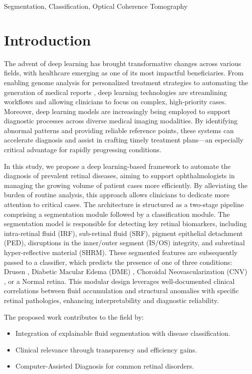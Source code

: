 \documentclass[conference]{IEEEtran}
\begin{document}
\begin{IEEEkeywords}
Segmentation, Classification, Optical Coherence Tomography
\end{IEEEkeywords}



\section{Introduction}
The advent of deep learning has brought transformative changes across various fields, with healthcare emerging as one of its most impactful beneficiaries. From enabling genome analysis for personalized treatment strategies to automating the generation of medical reports \cite{Hartsock2024VLM}, deep learning technologies are streamlining workflows and allowing clinicians to focus on complex, high-priority cases. Moreover, deep learning models are increasingly being employed to support diagnostic processes across diverse medical imaging modalities. By identifying abnormal patterns and providing reliable reference points, these systems can accelerate diagnosis and assist in crafting timely treatment plans—an especially critical advantage for rapidly progressing conditions.

In this study, we propose a deep learning-based framework to automate the diagnosis of prevalent retinal diseases, aiming to support ophthalmologists in managing the growing volume of patient cases more efficiently. By alleviating the burden of routine analysis, this approach allows clinicians to dedicate more attention to critical cases. The architecture is structured as a two-stage pipeline comprising a segmentation module followed by a classification module. The segmentation model is responsible for detecting key retinal biomarkers, including intra-retinal fluid (IRF), sub-retinal fluid (SRF), pigment epithelial detachment (PED), disruptions in the inner/outer segment (IS/OS) integrity, and subretinal hyper-reflective material (SHRM). These segmented features are subsequently passed to a classifier, which predicts the presence of one of three conditions: Drusen \cite{Sikorski2011DrusenFluid}, Diabetic Macular Edema (DME) \cite{Deak2010DMECorrelation}, Choroidal Neovascularization (CNV) \cite{Hilely2021SubretinalFluid}, or a Normal retina. This modular design leverages well-documented clinical correlations between fluid accumulation and structural anomalies with specific retinal pathologies, enhancing interpretability and diagnostic reliability.

The proposed work contributes to the field by:
\begin{itemize}
    \item Integration of explainable fluid segmentation with disease classification.
    \item Clinical relevance through transparency and efficiency gains.
    \item Computer-Assisted Diagnosis for common retinal disorders.
\end{itemize}
\end{document}
